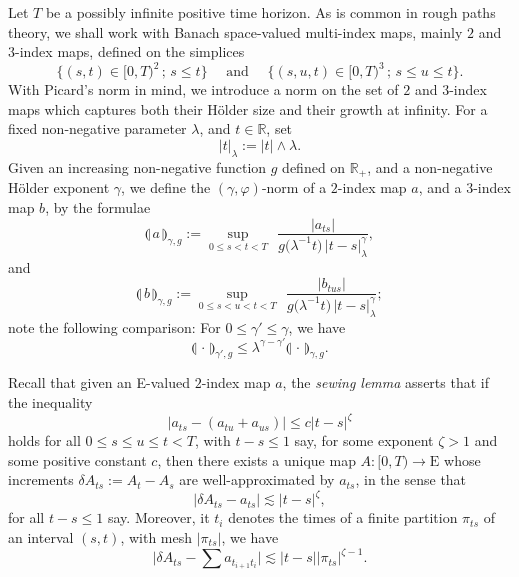 \documentclass[11pt,a4paper]{amsart}
\newcommand{\RR}{\mathbb{R}}  \newcommand{\CC}{\mathbb{C}}  \newcommand{\LL}{\mathbb{L}}  \newcommand{\WW}{\mathbb{W}}
\renewcommand{\leq}{\leqslant}
\newcommand{\ssk}{\smallskip}
\numberwithin{equation}{section} %
\begin{document}
Let $T$ be a possibly infinite positive time horizon. As is common in rough paths theory, we shall work with Banach space-valued multi-index maps, mainly $2$ and $3$-index maps, defined on the simplices
$$
\Big\{(s,t)\in [0,T)^2\,;\,s\leq t\Big\}\quad \textrm{ and } \quad \Big\{(s,u,t)\in [0,T)^3\,;\,s\leq u\leq t\Big\}.
$$
With Picard's norm in mind, we introduce a norm on the set of $2$ and $3$-index maps which captures both their H\"older size and their growth at infinity. For a fixed non-negative parameter $\lambda$, and $t\in\RR$, set
$$
|t|_\lambda := |t|\wedge\lambda.
$$
Given an increasing non-negative function $g$ defined on $\RR_+$, and a non-negative H\"older exponent $\gamma$, we define the $(\gamma,\varphi)$-norm of a $2$-index map $a$, and a $3$-index map $b$, by the formulae
$$
\llparenthesis\, a \,\rrparenthesis_{\gamma,g} := \underset{0\leq s<t<T}{\sup}\;\,\frac{\big| a_{ts}\big|}{g\big(\lambda^{-1} t\big)\,|t-s|_\lambda^\gamma},
$$
and 
$$
\llparenthesis\, b \,\rrparenthesis_{\gamma,g} := \underset{0\leq s< u<t<T}{\sup}\;\,\frac{\big| b_{tus}\big|}{g\big(\lambda^{-1} t\big)\,|t-s|_\lambda^\gamma};
$$
note the following comparison: For $0\leq \gamma'\leq \gamma$, we have
\begin{equation}
\label{EqComparisonNorms}
\llparenthesis\, \cdot \,\rrparenthesis_{\gamma',g} \leq \lambda^{\gamma-\gamma'} \llparenthesis\, \cdot \,\rrparenthesis_{\gamma,g}.
\end{equation}

\ssk

Recall that given an E-valued $2$-index map $a$, the \textit{sewing lemma} \cite{Gubinelli04, FdlP} asserts that if the inequality
\begin{equation}
\label{EqAlmostAdditivity}
\big| a_{ts} - (a_{tu}+a_{us})\big| \leq c|t-s|^\zeta
\end{equation}
holds for all $0\leq s\leq u\leq t<T$, with $t-s\leq 1$ say, for some exponent $\zeta>1$ and some positive constant $c$, then there exists a unique map $A : [0,T)\rightarrow \textrm{E}$ whose increments $\delta A_{ts} := A_t-A_s$ are well-approximated by $a_{ts}$, in the sense that 
$$
\big|\delta A_{ts} - a_{ts} \big| \lesssim |t-s|^\zeta,
$$
for all $t-s\leq 1$ say. Moreover, it $t_i$ denotes the times of a finite partition $\pi_{ts}$ of an interval $(s,t)$, with mesh $\big|\pi_{ts}\big|$, we have
\begin{equation}
\label{EqEstimateAlmostAdditiveFunctional}
\big|\delta A_{ts} - \sum a_{t_{i+1}t_i}\big| \lesssim |t-s|\big|\pi_{ts}\big|^{\zeta-1}.
\end{equation}
\end{document}

